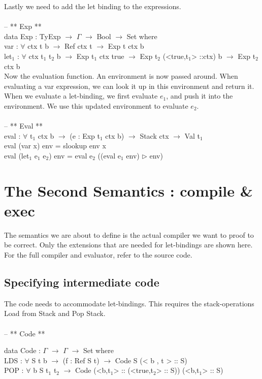 \documentclass[paper=a4, fontsize=11pt]{scrartcl} %
\numberwithin{equation}{section} %
\numberwithin{figure}{section} %
\numberwithin{table}{section} %
\begin{document}
\normalfont
Lastly we need to add the let binding to the expressions.\\
\\
\ttfamily
-- ** Exp **\\

data Exp : TyExp $\rightarrow$ $\Gamma$ $\rightarrow$ Bool $\rightarrow$ Set where\\
  var  : $\forall$ {ctx t b} $\rightarrow$ Ref ctx t $\rightarrow$ Exp t ctx b\\
  let$_1$ : $\forall$ {ctx t$_1$ t$_2$ b} $\rightarrow$ Exp t$_1$ ctx true $\rightarrow$ Exp t$_2$ (<true,t$_1$>  ::ctx) b $\rightarrow$ Exp t$_2$ ctx b\\

\normalfont
Now the evaluation function. An environment is now passed around. When evaluating a var expression, we can look it up in this environment and return it. When we evaluate a let-binding, we first evaluate $e_1$, and push it into the environment. We use this updated environment to evaluate $e_2$.\\
\\
\ttfamily
-- ** Eval **\\

eval : $\forall$ {t$_1$ ctx b} $\rightarrow$ (e : Exp t$_1$ ctx b) $\rightarrow$ Stack ctx $\rightarrow$ Val t$_1$\\
eval (var x) env = slookup env x\\
eval (let$_1$ e$_1$ e$_2$) env = eval e$_2$ ((eval e$_1$ env) $\rhd$ env)\\
\normalfont
\section{The Second Semantics : compile \& exec}
The semantics we are about to define is the actual compiler we want to proof to be correct. Only the extensions that are needed for let-bindings are shown here. For the full compiler and evaluator, refer to the source code.
\subsection{Specifying intermediate code}
The code needs to accommodate let-bindings. This requires the stack-operations Load from Stack and Pop Stack.\\
\\
\ttfamily
-- ** Code **

data Code : $\Gamma$ $\rightarrow$ $\Gamma$ $\rightarrow$ Set where\\
	LDS   : $\forall$ {S t b} $\rightarrow$ (f : Ref S t) $\rightarrow$ Code S (< b , t > :: S)\\
    POP   : $\forall$ {b S t$_1$ t$_2$} $\rightarrow$ Code (<b,t$_1$> :: (<true,t$_2$> :: S)) (<b,t$_1$> :: S)\\
\normalfont
\end{document}
